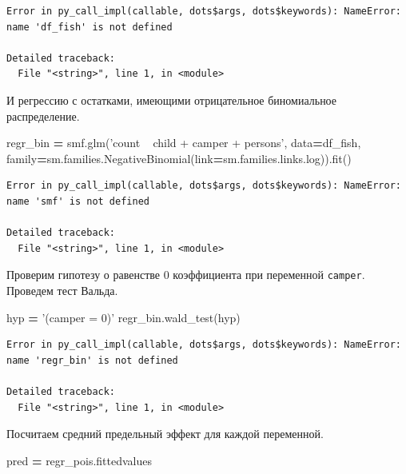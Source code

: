 \documentclass[]{book}
\newenvironment{Shaded}{\begin{snugshade}}{\end{snugshade}}
\newcommand{\NormalTok}[1]{#1}
\newcommand{\OperatorTok}[1]{\textcolor[rgb]{0.81,0.36,0.00}{\textbf{#1}}}
\newcommand{\StringTok}[1]{\textcolor[rgb]{0.31,0.60,0.02}{#1}}
\begin{document}
\begin{verbatim}
Error in py_call_impl(callable, dots$args, dots$keywords): NameError: name 'df_fish' is not defined

Detailed traceback: 
  File "<string>", line 1, in <module>
\end{verbatim}

И регрессию с остатками, имеющими отрицательное биномиальное распределение.

\begin{Shaded}
\begin{Highlighting}[]
\NormalTok{regr_bin }\OperatorTok{=}\NormalTok{ smf.glm(}\StringTok{'count ~ child + camper +  persons'}\NormalTok{, data}\OperatorTok{=}\NormalTok{df_fish,}
\NormalTok{              family}\OperatorTok{=}\NormalTok{sm.families.NegativeBinomial(link}\OperatorTok{=}\NormalTok{sm.families.links.log)).fit()}
\end{Highlighting}
\end{Shaded}

\begin{verbatim}
Error in py_call_impl(callable, dots$args, dots$keywords): NameError: name 'smf' is not defined

Detailed traceback: 
  File "<string>", line 1, in <module>
\end{verbatim}

Проверим гипотезу о равенстве 0 коэффициента при переменной \texttt{camper}. Проведем тест Вальда.

\begin{Shaded}
\begin{Highlighting}[]
\NormalTok{hyp }\OperatorTok{=} \StringTok{'(camper = 0)'}
\NormalTok{regr_bin.wald_test(hyp)}
\end{Highlighting}
\end{Shaded}

\begin{verbatim}
Error in py_call_impl(callable, dots$args, dots$keywords): NameError: name 'regr_bin' is not defined

Detailed traceback: 
  File "<string>", line 1, in <module>
\end{verbatim}

Посчитаем средний предельный эффект для каждой переменной.

\begin{Shaded}
\begin{Highlighting}[]
\NormalTok{pred }\OperatorTok{=}\NormalTok{ regr_pois.fittedvalues}
\end{Highlighting}
\end{Shaded}
\end{document}

